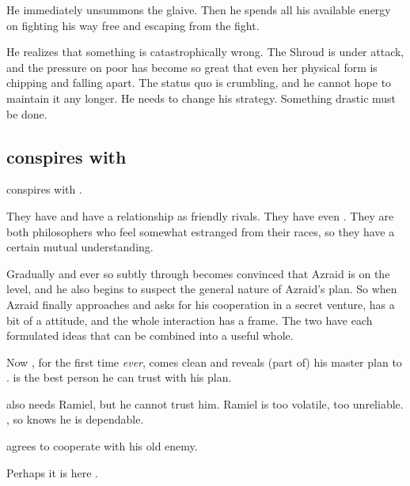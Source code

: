 He immediately unsummons the glaive. 
Then he spends all his available energy on fighting his way free and escaping from the fight. 

He realizes that something is catastrophically wrong. 
The Shroud is under attack, and the pressure on poor \Rystessakhin{} has become so great that even her physical form is chipping and falling apart. 
The status quo is crumbling, and he cannot hope to maintain it any longer. 
He needs to change his strategy.
Something drastic must be done. 








\subsection{\Azraid conspires with \Ishnaruchaefir}
\Azraid{} conspires with \Ishnaruchaefir. 

They have  and have a relationship as friendly rivals. 
They have even . 
They are both philosophers who feel somewhat estranged from their races, so they have a certain mutual understanding. 

Gradually and ever so subtly through  \Ishnaruchaefir becomes convinced that Azraid is on the level, and he also begins to suspect the general nature of Azraid's plan. 
So when Azraid finally approaches \Ishnaruchaefir and asks for his cooperation in a secret venture, \Ishnaruchaefir has a bit of a  attitude, and the whole interaction has a  frame.
The two have each formulated ideas that can be combined into a useful whole.

Now \Azraid{}, for the first time \emph{ever}, comes clean and reveals (part of) his master plan to \Ishnaruchaefir. 
\Ishnaruchaefir{} is the best person he can trust with his plan. 

\Azraid{} also needs Ramiel, but he cannot trust him.
Ramiel is too volatile, too unreliable. 
\Ishnaruchaefir{} , so \Azraid{} knows he is dependable.

\Ishnaruchaefir{} agrees to cooperate with his old enemy. 

Perhaps it is here \Azraid{} . 








